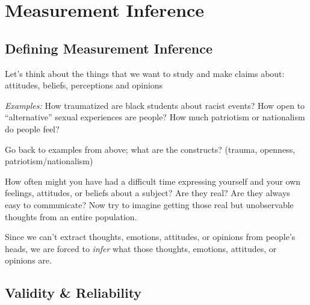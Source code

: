 \documentclass[11pt]{lecturenotes}
\begin{document}
\section{Measurement Inference}
\subsection[10]{Defining Measurement Inference}
Let's think about the things that we want to study and make claims about: attitudes, beliefs, perceptions and opinions

\slide
\emph{Examples:} How traumatized are black students about racist events? How open to ``alternative'' sexual experiences are people? How much patriotism or nationalism do people feel? 

\slide
{}

\slide
Go back to examples from above; what are the constructs? (trauma, openness, patriotism\slash nationalism)

How often might you have had a difficult time expressing yourself and your own feelings, attitudes, or beliefs about a subject? Are they real? Are they always easy to communicate? Now try to imagine getting those real but unobservable thoughts from an entire population. 

\slide
\begin{center}
\end{center}

Since we can't extract thoughts, emotions, attitudes, or opinions from people's heads, we are forced to \emph{infer} what those thoughts, emotions, attitudes, or opinions are. 

\subsection[20]{Validity \& Reliability}
\slide
{}
\end{document}
